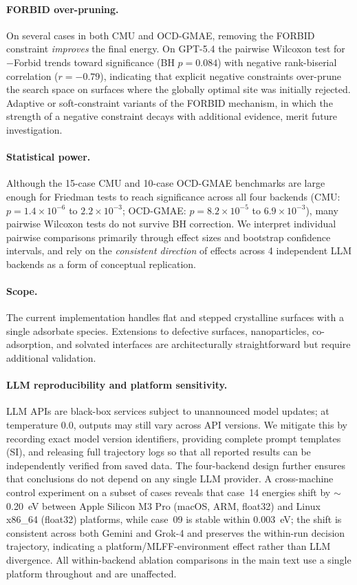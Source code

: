 \paragraph{FORBID over-pruning.}
On several cases in both CMU and OCD-GMAE, removing the FORBID constraint \textit{improves} the final energy.
On GPT-5.4 the pairwise Wilcoxon test for $-$Forbid trends toward significance (BH $p = 0.084$) with negative rank-biserial correlation ($r = -0.79$), indicating that explicit negative constraints over-prune the search space on surfaces where the globally optimal site was initially rejected.
Adaptive or soft-constraint variants of the FORBID mechanism, in which the strength of a negative constraint decays with additional evidence, merit future investigation.

\paragraph{Statistical power.}
Although the 15-case CMU and 10-case OCD-GMAE benchmarks are large enough for Friedman tests to reach significance across all four backends (CMU: $p = 1.4\times10^{-6}$ to $2.2\times10^{-3}$; OCD-GMAE: $p = 8.2\times10^{-5}$ to $6.9\times10^{-3}$), many pairwise Wilcoxon tests do not survive BH correction.
We interpret individual pairwise comparisons primarily through effect sizes and bootstrap confidence intervals, and rely on the \textit{consistent direction} of effects across 4 independent LLM backends as a form of conceptual replication.

\paragraph{Scope.}
The current implementation handles flat and stepped crystalline surfaces with a single adsorbate species.
Extensions to defective surfaces, nanoparticles, co-adsorption, and solvated interfaces are architecturally straightforward but require additional validation.

\paragraph{LLM reproducibility and platform sensitivity.}
LLM APIs are black-box services subject to unannounced model updates; at temperature 0.0, outputs may still vary across API versions.
We mitigate this by recording exact model version identifiers, providing complete prompt templates (SI), and releasing full trajectory logs so that all reported results can be independently verified from saved data.
The four-backend design further ensures that conclusions do not depend on any single LLM provider.
A cross-machine control experiment on a subset of cases reveals that case~14 energies shift by $\sim$0.20~eV between Apple Silicon M3 Pro (macOS, ARM, float32) and Linux x86\_64 (float32) platforms, while case~09 is stable within 0.003~eV; the shift is consistent across both Gemini and Grok-4 and preserves the within-run decision trajectory, indicating a platform/MLFF-environment effect rather than LLM divergence.
All within-backend ablation comparisons in the main text use a single platform throughout and are unaffected.

